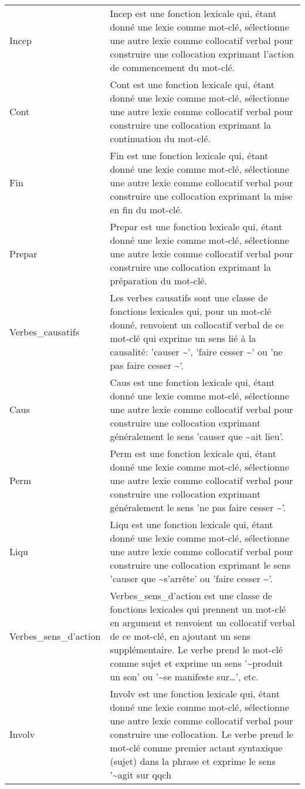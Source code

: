 \begin{longtable}{ll}
Incep & Incep est une fonction lexicale qui, étant donné une lexie comme mot-clé, sélectionne une autre lexie comme collocatif verbal pour construire une collocation exprimant l'action de commencement du mot-clé. \\
Cont & Cont est une fonction lexicale qui, étant donné une lexie comme mot-clé, sélectionne une autre lexie comme collocatif verbal pour construire une collocation exprimant la continuation du mot-clé. \\
Fin & Fin est une fonction lexicale qui, étant donné une lexie comme mot-clé, sélectionne une autre lexie comme collocatif verbal pour construire une collocation exprimant la mise en fin du mot-clé. \\
Prepar & Prepar est une fonction lexicale qui, étant donné une lexie comme mot-clé, sélectionne une autre lexie comme collocatif verbal pour construire une collocation exprimant la préparation du mot-clé. \\
Verbes\_causatifs & Les verbes causatifs sont une classe de fonctions lexicales qui, pour un mot-clé donné, renvoient un collocatif verbal de ce mot-clé qui exprime un sens lié à la causalité: 'causer \textasciitilde ', 'faire cesser \textasciitilde ' ou 'ne pas faire cesser \textasciitilde '. \\
Caus & Caus est une fonction lexicale qui, étant donné une lexie comme mot-clé, sélectionne une autre lexie comme collocatif verbal pour construire une collocation exprimant généralement le sens 'causer que \textasciitilde \space ait lieu'. \\
Perm & Perm est une fonction lexicale qui, étant donné une lexie comme mot-clé, sélectionne une autre lexie comme collocatif verbal pour construire une collocation exprimant généralement le sens 'ne pas faire cesser \textasciitilde '. \\
Liqu & Liqu est une fonction lexicale qui, étant donné une lexie comme mot-clé, sélectionne une autre lexie comme collocatif verbal pour construire une collocation exprimant le sens 'causer que \textasciitilde \space s'arrête' ou 'faire cesser \textasciitilde '. \\
Verbes\_sens\_d'action & Verbes\_sens\_d'action est une classe de fonctions lexicales qui prennent un mot-clé en argument et renvoient un collocatif verbal de ce mot-clé, en ajoutant un sens supplémentaire. Le verbe prend le mot-clé comme sujet et exprime un sens '\textasciitilde \space produit un son' ou '\textasciitilde \space se manifeste sur…', etc. \\
Involv & Involv est une fonction lexicale qui, étant donné une lexie comme mot-clé, sélectionne une autre lexie comme collocatif verbal pour construire une collocation. Le verbe prend le mot-clé comme premier actant syntaxique (sujet) dans la phrase et exprime le sens '\textasciitilde \space agit sur qqch \\

\end{longtable}
